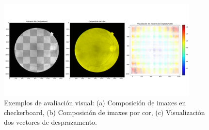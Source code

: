 \begin{figure}[tbp]
    \centering
    \includegraphics[width=0.9\textwidth]{imaxes/visex.png}
    \caption{Exemplos de avaliación visual: (a) Composición de imaxes en checkerboard, (b) Composición de imaxes por cor, (c) Visualización dos vectores de desprazamento.}
    \label{fig:visex}
\end{figure}